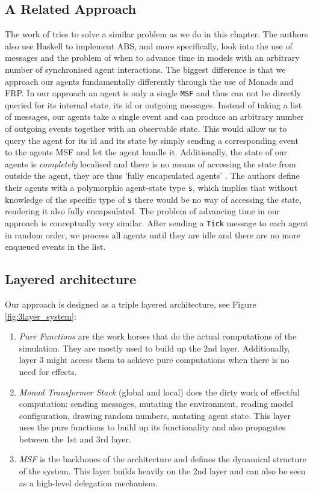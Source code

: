 \subsection{A Related Approach}
The work of \cite{botta_time_2010} tries to solve a similar problem as we do in this chapter. The authors also use Haskell to implement ABS, and more specifically, look into the use of messages and the problem of when to advance time in models with an arbitrary number of synchronised agent interactions.
The biggest difference is that we approach our agents fundamentally differently through the use of Monads and FRP. In our approach an agent is only a single \texttt{MSF} and thus can not be directly queried for its internal state, its id or outgoing messages. Instead of taking a list of messages, our agents take a single event and can produce an arbitrary number of outgoing events together with an observable state. This would allow us to query the agent for its id and its state by simply sending a corresponding event to the agents MSF and let the agent handle it. Additionally, the state of our agents is \textit{completely} localised and there is no means of accessing the state from outside the agent, they are thus 'fully encapsulated agents' \cite{botta_time_2010}. The authors define their agents with a polymorphic agent-state type \texttt{s}, which implies that without knowledge of the specific type of \texttt{s} there would be no way of accessing the state, rendering it also fully encapsulated.
The problem of advancing time in our approach is conceptually very similar. After sending a \texttt{Tick} message to each agent in random order, we process all agents until they are idle and there are no more enqueued events in the list. %

\subsection{Layered architecture}
Our approach is designed as a triple layered architecture, see Figure \ref{fig:3layer_system}:
\begin{enumerate}
	\item \textit{Pure Functions} are the work horses that do the actual computations of the simulation. They are mostly used to build up the 2nd layer. Additionally, layer 3 might access them to achieve pure computations when there is no need for effects.
	
	\item \textit{Monad Transformer Stack} (global and local) does the dirty work of effectful computation: sending messages, mutating the environment, reading model configuration, drawing random numbers, mutating agent state. This layer uses the pure functions to build up its functionality and also propagates between the 1st and 3rd layer.
	
	\item \textit{MSF} is the backbones of the architecture and defines the dynamical structure of the system. This layer builds heavily on the 2nd layer and can also be seen as a high-level delegation mechanism.
\end{enumerate}

